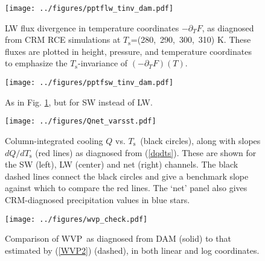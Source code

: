 \documentclass[10pt]{article}
\newcommand{\eqnref}[1]{(\ref{#1})}
\newcommand{\ppt}{\ensuremath{\partial_T}}
\newcommand{\Ts}{\ensuremath{T_\mathrm{s}}}
\newcommand{\WVP}{\ensuremath{\mathrm{WVP}}}
\begin{document}

\begin{figure}[h]
	\begin{center}
			\texttt{[image: ../figures/pptflw\_tinv\_dam.pdf]}
		\caption{LW flux divergence in temperature coordinates $-\ppt F$, as diagnosed from CRM RCE simulations at \Ts=(280,\ 290,\ 300,\ 310) K. These fluxes are plotted in height, pressure, and temperature coordinates to emphasize the \Ts-invariance of  $(-\ppt F)(T)$.
		\label{pptflw_tinv_dam}
		}
	\end{center}
\end{figure}

\begin{figure}[h]
	\begin{center}
			\texttt{[image: ../figures/pptfsw\_tinv\_dam.pdf]}
		\caption{As in Fig. \ref{pptflw_tinv_dam}, but for SW instead of LW.
		\label{pptfsw_tinv_dam}
		}
	\end{center}
\end{figure}

\begin{figure}[h]
	\begin{center}
			\texttt{[image: ../figures/Qnet\_varsst.pdf]}
		\caption{Column-integrated cooling $Q$ vs. \Ts\ (black circles), along with slopes $d Q/d \Ts$ (red lines) as diagnosed from \eqnref{dqdts}. These are shown for the SW (left), LW (center) and net (right) channels.  The black dashed lines connect the black circles and give a benchmark slope against which to compare the red lines. The `net' panel also gives CRM-diagnosed precipitation values in blue stars.
		\label{Qnet_varsst}
		}
	\end{center}
\end{figure}


\begin{figure}[h]
	\begin{center}
			\texttt{[image: ../figures/wvp\_check.pdf]}
		\caption{Comparison of \WVP\ as diagnosed from DAM (solid) to that estimated by \eqnref{WVP2} (dashed), in both linear and log coordinates.
		\label{wvp_check}
		}
	\end{center}
\end{figure}
\end{document}
